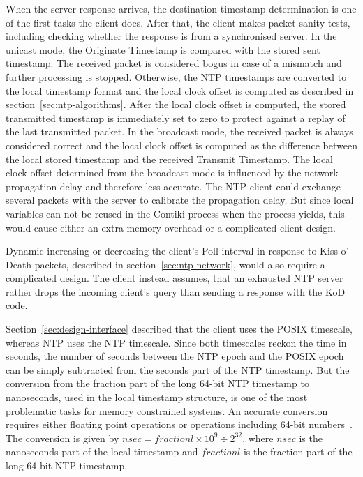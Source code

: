 When the server response arrives,
the destination timestamp determination is one of the first tasks the client does.
After that, the client makes packet sanity tests, including
checking whether the response is from a synchronised server.
In the unicast mode, the Originate Timestamp is compared with the stored sent timestamp. %
The received packet is considered bogus in case of a mismatch and further processing is stopped. %
Otherwise, the NTP timestamps are converted to the local timestamp format and
the local clock offset is computed as described in section~\ref{sec:ntp-algorithms}.
After the local clock offset is computed,
the stored transmitted timestamp is immediately set to zero
to protect against a replay of the last transmitted packet.
In the broadcast mode, the received packet is always considered correct
and the local clock offset is computed as the difference between the local stored timestamp
and the received Transmit Timestamp.
The local clock offset determined from the broadcast mode
is influenced by the network propagation delay and therefore less accurate.
The NTP client could exchange several packets with the server to calibrate the propagation delay.
But since local variables can not be reused in the Contiki process when the process yields,
this would cause either an extra memory overhead or a complicated client design.

Dynamic increasing or decreasing the client's Poll interval in response to
Kiss-o'-Death packets, described in section~\ref{sec:ntp-network}, would also
require a complicated design.
The client instead assumes, that an exhausted NTP server rather drops the incoming
client's query than sending a response with the KoD code.

Section~\ref{sec:design-interface} described that the client uses the POSIX timescale,
whereas NTP uses the NTP timescale.
Since both timescales reckon the time in seconds, %
the number of seconds between the NTP epoch and the POSIX epoch
can be simply subtracted from the seconds part of the NTP timestamp.
But the conversion from the fraction part of the long 64-bit NTP timestamp to nanoseconds,
used in the local timestamp structure,
is one of the most problematic tasks for memory constrained systems.
An accurate conversion requires either floating point operations or operations including 64-bit numbers~\cite{c99}.
The conversion is given by
$nsec = fractionl \times 10^9 \div 2^{32}$, where $nsec$ is the nanoseconds part of the local timestamp
and $fractionl$ is the fraction part of the long 64-bit NTP timestamp.

